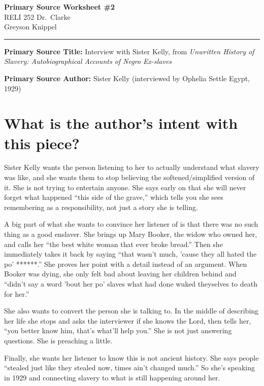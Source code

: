 \documentclass[12pt]{article}
\begin{document}
\begin{center}
	{\Large\bfseries Primary Source Worksheet \#2}\\[0.6em]
	RELI 252 \quad\textbullet\quad Dr.\ Clarke\\[0.3em]
	Greyson Knippel
\end{center}

\vspace{1em}
\hrule
\vspace{1.5em}

\noindent\textbf{Primary Source Title:} Interview with Sister Kelly, from \textit{Unwritten History of Slavery: Autobiographical Accounts of Negro Ex-slaves}

\vspace{0.5em}

\noindent\textbf{Primary Source Author:} Sister Kelly (interviewed by Ophelia Settle Egypt, 1929)

\section*{What is the author's intent with this piece?}

Sister Kelly wants the person listening to her to actually understand what slavery was like, and she wants them to stop believing the softened/simplified version of it. She is not trying to entertain anyone. She says early on that she will never forget what happened ``this side of the grave,'' which tells you she sees remembering as a responsibility, not just a story she is telling.

A big part of what she wants to convince her listener of is that there was no such thing as a good enslaver. She brings up Mary Booker, the widow who owned her, and calls her ``the best white woman that ever broke bread.'' Then she immediately takes it back by saying ``that wasn't much, 'cause they all hated the po' ******.'' She proves her point with a detail instead of an argument. When Booker was dying, she only felt bad about leaving her children behind and ``didn't say a word 'bout her po' slaves what had done wuked theyselves to death for her.''

She also wants to convert the person she is talking to. In the middle of describing her life she stops and asks the interviewer if she knows the Lord, then tells her, ``you better know him, that's what'll help you.'' She is not just answering questions. She is preaching a little.

Finally, she wants her listener to know this is not ancient history. She says people ``stealed just like they stealed now, times ain't changed much.'' So she's speaking in 1929 and connecting slavery to what is still happening around her.
\end{document}
